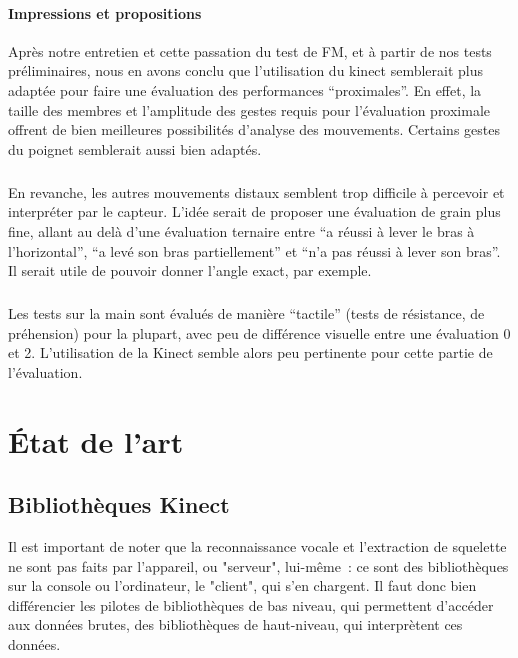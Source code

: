\documentclass[french,12pt]{report}
\begin{document}
	\subsubsection{Impressions et propositions}
Après notre entretien et cette passation du test de FM, et à partir de nos tests préliminaires, nous en avons 
conclu que l'utilisation du kinect semblerait plus adaptée pour faire une évaluation des performances “proximales”.
En effet, la taille des membres et l'amplitude des gestes requis pour l'évaluation proximale offrent de bien 
meilleures possibilités d'analyse des mouvements. Certains gestes du poignet semblerait aussi bien adaptés.
\paragraph{}En revanche, les autres mouvements distaux semblent trop difficile à percevoir et interpréter par le capteur.
L’idée serait de proposer une évaluation de grain plus fine, allant au delà d’une évaluation ternaire entre 
“a réussi à lever le bras à l’horizontal”, “a levé son bras partiellement” et “n’a pas réussi à lever son bras”. 
Il serait utile de pouvoir donner l’angle exact, par exemple.   

\paragraph{}Les tests sur la main sont évalués de manière “tactile” (tests de résistance, de préhension) pour la plupart, 
avec peu de différence visuelle entre une évaluation 0 et 2. L’utilisation de la Kinect semble alors peu pertinente
pour cette partie de l’évaluation.
		
	\chapter{État de l'art}
	
	
  \section{Bibliothèques Kinect}
		
Il est important de noter que la reconnaissance vocale et l'extraction de 
squelette ne sont pas faits par l'appareil, ou "serveur", lui-même~: ce sont des
bibliothèques sur la console ou l'ordinateur, le "client", qui s'en chargent. 
Il faut donc bien
différencier les pilotes de bibliothèques de bas niveau, qui permettent 
d'accéder aux données brutes, des
bibliothèques de haut-niveau, qui interprètent ces données.
\end{document}
